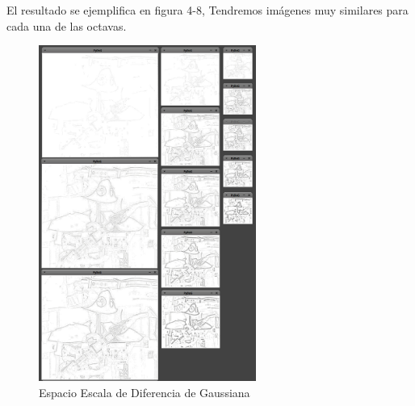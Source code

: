 El resultado se ejemplifica en figura 4-8, Tendremos imágenes muy similares para cada una de las octavas. 
\begin{figure}[H]
			\centering
				\includegraphics[height=11cm]{img/pyDoGT.jpg}
			\caption{Espacio Escala de Diferencia de Gaussiana}
\end{figure}
